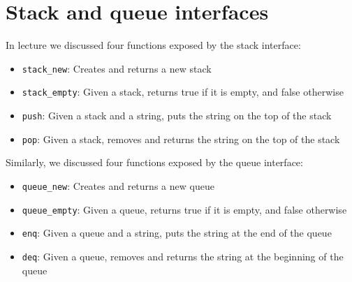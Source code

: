 \section*{Stack and queue interfaces%
}

In lecture we discussed four functions exposed by the stack interface:
\begin{itemize}
  \itemsep=0pt
  \topsep=0pt
  \item \lstinline'stack_new': %
    Creates and returns a new stack
  \item \lstinline'stack_empty': %
    Given a stack, returns true if it is empty, and false otherwise
  \item \lstinline'push': %
    Given a stack and a string, puts the string on the top of the
    stack
  \item \lstinline'pop': %
    Given a stack, removes and returns the string on the top of the
    stack
\end{itemize}

Similarly, we discussed four functions exposed by the queue interface:
\begin{itemize}
  \itemsep=0pt
  \topsep=0pt
  \item \lstinline'queue_new': %
    Creates and returns a new queue
  \item \lstinline'queue_empty': %
    Given a queue, returns true if it is empty, and false otherwise
  \item \lstinline'enq': %
    Given a queue and a string, puts the string at the end of the queue
  \item \lstinline'deq': %
    Given a queue, removes and returns the string at the beginning of
    the queue
\end{itemize}
